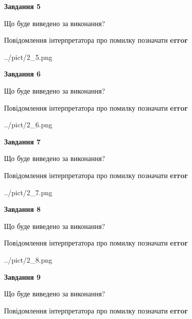 \documentclass[11pt, ukrainian]{article}
\begin{document}
{\begin {large}
{\begin {center}\textbf{Завдання 5}\end {center}}\par
Що буде виведено за виконання? \par
Повідомлення інтерпретатора про помилку позначати \textbf{error}

\begin{center}
	{../pict/2_5.png}
\end{center}
\newpage

{\begin {center}\textbf{Завдання 6}\end {center}}\par
Що буде виведено за виконання? \par
Повідомлення інтерпретатора про помилку позначати \textbf{error}

\begin{center}
	{../pict/2_6.png}
\end{center}
\newpage

{\begin {center}\textbf{Завдання 7}\end {center}}\par
Що буде виведено за виконання? \par
Повідомлення інтерпретатора про помилку позначати \textbf{error}

\begin{center}
	{../pict/2_7.png}
\end{center}
\newpage

{\begin {center}\textbf{Завдання 8}\end {center}}\par
Що буде виведено за виконання? \par
Повідомлення інтерпретатора про помилку позначати \textbf{error}

\begin{center}
	{../pict/2_8.png}
\end{center}
\newpage

{\begin {center}\textbf{Завдання 9}\end {center}}\par
Що буде виведено за виконання? \par
Повідомлення інтерпретатора про помилку позначати \textbf{error}


\end{large}}
\end{document}
